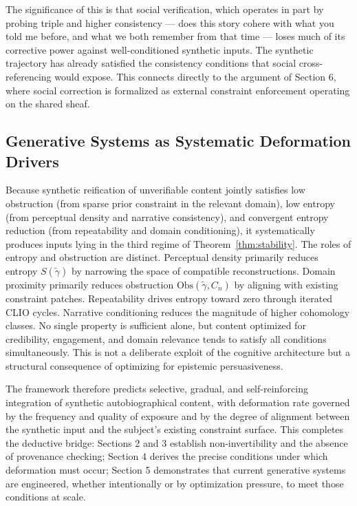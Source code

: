 \documentclass[12pt, a4paper]{article}
\begin{document}
The significance of this is that social verification, which operates in part by probing triple and higher consistency --- does this story cohere with what you told me before, and what we both remember from that time --- loses much of its corrective power against well-conditioned synthetic inputs. The synthetic trajectory has already satisfied the consistency conditions that social cross-referencing would expose. This connects directly to the argument of Section 6, where social correction is formalized as external constraint enforcement operating on the shared sheaf.

\subsection{Generative Systems as Systematic Deformation Drivers}

Because synthetic reification of unverifiable content jointly satisfies low obstruction (from sparse prior constraint in the relevant domain), low entropy (from perceptual density and narrative consistency), and convergent entropy reduction (from repeatability and domain conditioning), it systematically produces inputs lying in the third regime of Theorem~\ref{thm:stability}. The roles of entropy and obstruction are distinct. Perceptual density primarily reduces entropy $S(\tilde{\gamma})$ by narrowing the space of compatible reconstructions. Domain proximity primarily reduces obstruction $\mathrm{Obs}(\tilde{\gamma}, C_n)$ by aligning with existing constraint patches. Repeatability drives entropy toward zero through iterated CLIO cycles. Narrative conditioning reduces the magnitude of higher cohomology classes. No single property is sufficient alone, but content optimized for credibility, engagement, and domain relevance tends to satisfy all conditions simultaneously. This is not a deliberate exploit of the cognitive architecture but a structural consequence of optimizing for epistemic persuasiveness.

The framework therefore predicts selective, gradual, and self-reinforcing integration of synthetic autobiographical content, with deformation rate governed by the frequency and quality of exposure and by the degree of alignment between the synthetic input and the subject's existing constraint surface. This completes the deductive bridge: Sections 2 and 3 establish non-invertibility and the absence of provenance checking; Section 4 derives the precise conditions under which deformation must occur; Section 5 demonstrates that current generative systems are engineered, whether intentionally or by optimization pressure, to meet those conditions at scale.
\end{document}
